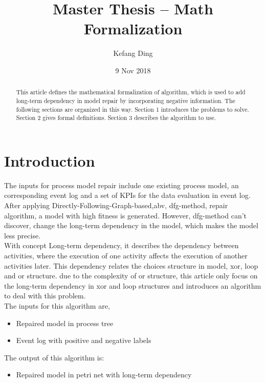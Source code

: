 \documentclass[]{article}
\title{Master Thesis --  Math Formalization}
\author{Kefang Ding}
\date{9 Nov 2018}
\begin{document}
\maketitle

\hrulefill
\hrulefill 

\begin{abstract}
This article defines the mathematical formalization of algorithm, which is used to add long-term dependency in model repair by incorporating negative information. The following sections are organized in this way. Section 1 introduces the problems to solve. Section 2 gives formal definitions. Section 3 describes the algorithm to use. 
\end{abstract}

\section{Introduction}
The inputs for process model repair include one existing process model, an corresponding event log and a set of KPIs for the data evaluation in event log. After applying Directly-Following-Graph-based,abv, dfg-method, repair algorithm, a model with high fitness is generated. However, dfg-method can't discover, change the long-term dependency in the model, which makes the model less precise. \\
With concept Long-term dependency, it describes the dependency between activities, where the execution of one activity affects the execution of another activities later. This dependency  relates the choices structure in model, xor, loop and or structure. due to the complexity of or structure, this article only focus on the long-term dependency in xor and loop structures and introduces an algorithm to deal with this problem. \\
The inputs for this algorithm are,
\begin{itemize}
	\item Repaired model in process tree
	\item Event log with positive and negative labels
\end{itemize}
The output of this algorithm is: 
\begin{itemize}
	\item Repaired model in petri net with long-term dependency
\end{itemize}
\end{document}
